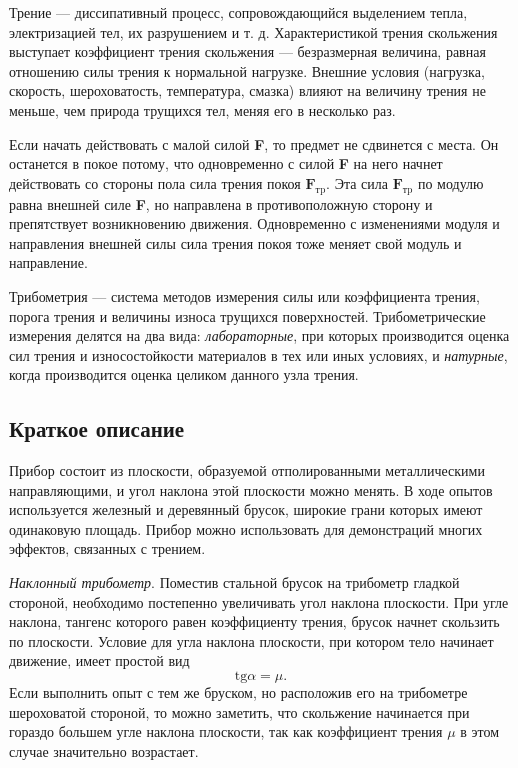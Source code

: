 \documentclass[All.tex]{subfiles}
\begin{document}
	Трение — диссипативный процесс, 
	сопровождающийся выделением тепла, электризацией тел, их разрушением и т. д. 
	Характеристикой трения скольжения выступает коэффициент трения 
	скольжения — безразмерная величина, равная отношению силы трения к нормальной нагрузке.
	Внешние условия (нагрузка, скорость, 
	 шероховатость, температура, смазка) влияют на величину 
	 трения не меньше, чем природа трущихся тел, меняя его в несколько раз.
	
	Если начать действовать с малой силой \textbf{F}, то предмет не сдвинется с места. 
	Он останется в покое потому, что одновременно с силой \textbf{F} на него начнет действовать со 
	стороны пола сила трения покоя $ \textbf{F}_{\text{тp}} $.
	Эта сила $ \textbf{F}_{\text{тp}} $ по модулю равна внешней силе \textbf{F}, но направлена в противоположную сторону и препятствует 	возникновению движения.
	Одновременно с изменениями модуля и направления внешней силы сила трения покоя тоже меняет свой 
	модуль и направление. 	
	
	Трибометрия — система методов измерения силы или 
	коэффициента трения, порога трения и величины износа трущихся поверхностей. 
	Трибометрические измерения делятся на два вида: 
	\textit{лабораторные}, при которых производится оценка сил трения и износостойкости материалов 
	в тех или иных условиях, и \textit{натурные}, когда производится оценка целиком данного узла трения.

	\subsection*{\textcolor{PineGreen}{Краткое описание}}
	
	Прибор состоит из плоскости, образуемой отполированными металлическими направляющими, и угол наклона этой плоскости можно менять.
	В ходе опытов используется железный и деревянный брусок, широкие грани которых имеют одинаковую площадь.
	Прибор можно использовать для демонстраций многих эффектов, связанных с трением.
	
	\textit{Наклонный трибометр}.	
	Поместив стальной брусок на трибометр гладкой стороной, необходимо постепенно увеличивать угол наклона плоскости.
	При угле наклона, тангенс которого равен коэффициенту трения, брусок начнет скользить по плоскости.
	Условие для угла наклона плоскости, при котором тело начинает движение, имеет простой вид
		 $$ \text{tg}\alpha=\mu. $$
	Если выполнить опыт с тем же бруском, но расположив его на трибометре шероховатой стороной, 
	то можно заметить, что скольжение начинается при гораздо большем угле наклона плоскости, 
	так как коэффициент трения $  \mu $ в этом случае значительно возрастает.
	
\end{document}
